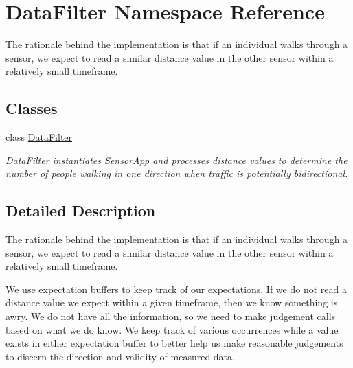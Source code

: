 \hypertarget{namespace_data_filter}{}\section{Data\+Filter Namespace Reference}
\label{namespace_data_filter}


The rationale behind the implementation is that if an individual walks through a sensor, we expect to read a similar distance value in the other sensor within a relatively small timeframe.  


\subsection*{Classes}
\begin{DoxyCompactItemize}
\item 
class \mbox{\hyperlink{class_data_filter_1_1_data_filter}{Data\+Filter}}
\begin{DoxyCompactList}\small\item\em \mbox{\hyperlink{class_data_filter_1_1_data_filter}{Data\+Filter}} instantiates Sensor\+App and processes distance values to determine the number of people walking in one direction when traffic is potentially bidirectional. \end{DoxyCompactList}\end{DoxyCompactItemize}


\subsection{Detailed Description}
The rationale behind the implementation is that if an individual walks through a sensor, we expect to read a similar distance value in the other sensor within a relatively small timeframe. 

We use \textquotesingle{}expectation buffers\textquotesingle{} to keep track of our expectations. If we do not read a distance value we expect within a given timeframe, then we know something is awry. We do not have all the information, so we need to make judgement calls based on what we do know. We keep track of various occurrences while a value exists in either expectation buffer to better help us make reasonable judgements to discern the direction and validity of measured data. 